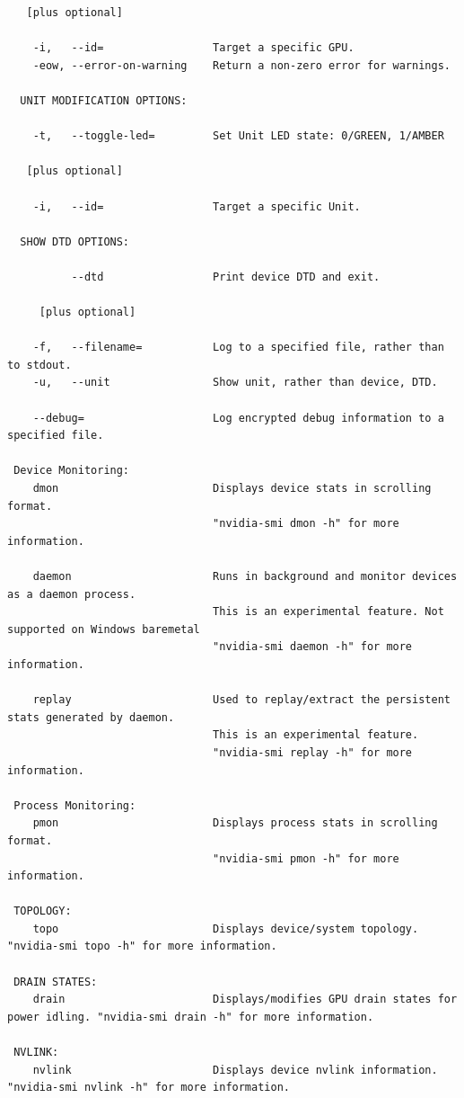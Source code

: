 \begin{lstlisting}
   [plus optional]

    -i,   --id=                 Target a specific GPU.
    -eow, --error-on-warning    Return a non-zero error for warnings.

  UNIT MODIFICATION OPTIONS:

    -t,   --toggle-led=         Set Unit LED state: 0/GREEN, 1/AMBER

   [plus optional]

    -i,   --id=                 Target a specific Unit.

  SHOW DTD OPTIONS:

          --dtd                 Print device DTD and exit.

     [plus optional]

    -f,   --filename=           Log to a specified file, rather than to stdout.
    -u,   --unit                Show unit, rather than device, DTD.

    --debug=                    Log encrypted debug information to a specified file.

 Device Monitoring:
    dmon                        Displays device stats in scrolling format.
                                "nvidia-smi dmon -h" for more information.

    daemon                      Runs in background and monitor devices as a daemon process.
                                This is an experimental feature. Not supported on Windows baremetal
                                "nvidia-smi daemon -h" for more information.

    replay                      Used to replay/extract the persistent stats generated by daemon.
                                This is an experimental feature.
                                "nvidia-smi replay -h" for more information.

 Process Monitoring:
    pmon                        Displays process stats in scrolling format.
                                "nvidia-smi pmon -h" for more information.

 TOPOLOGY:
    topo                        Displays device/system topology. "nvidia-smi topo -h" for more information.

 DRAIN STATES:
    drain                       Displays/modifies GPU drain states for power idling. "nvidia-smi drain -h" for more information.

 NVLINK:
    nvlink                      Displays device nvlink information. "nvidia-smi nvlink -h" for more information.


\end{lstlisting}
